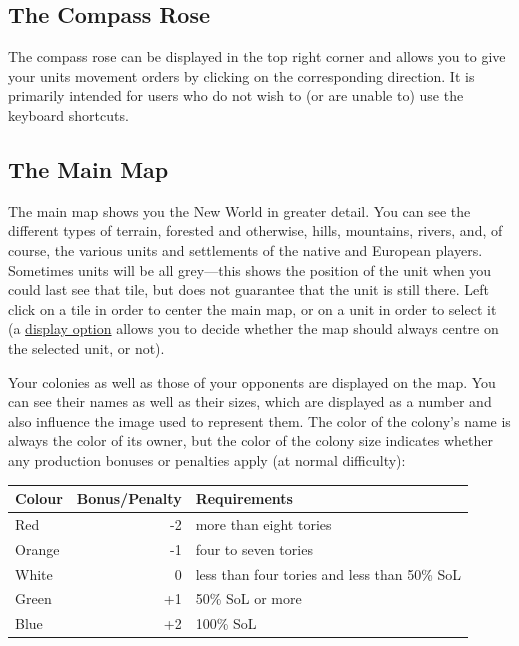 \documentclass[12pt]{book}
\begin{document}
\hypertarget{compass rose}{\subsection{The Compass Rose}}

The compass rose can be displayed in the top right corner and allows
you to give your units movement orders by clicking on the corresponding
direction. It is primarily intended for users who do not wish to (or
are unable to) use the keyboard shortcuts.


\hypertarget{main map}{\subsection{The Main Map}}

The main map shows you the New World in greater detail. You can see
the different types of terrain, forested and otherwise, hills,
mountains, rivers, and, of course, the various units and settlements
of the native and European players. Sometimes units will be all
grey---this shows the position of the unit when you could last see
that tile, but does not guarantee that the unit is still there. Left
click on a tile in order to center the main map, or on a unit in order
to select it (a \hyperlink{display options}{display option} allows you
to decide whether the map should always centre on the selected unit,
or not).

Your colonies as well as those of your opponents are displayed on the
map. You can see their names as well as their sizes, which are
displayed as a number and also influence the image used to represent
them. The color of the colony's name is always the color of its owner,
but the color of the colony size indicates whether any production
bonuses or penalties apply (at normal difficulty):

\vskip5mm

\begin{tabular}{l r l}
Colour&Bonus/Penalty&Requirements\\
\hline
Red    & -2 & more than eight tories\\
Orange & -1 & four to seven tories\\
White  &  0 & less than four tories and less than 50\% SoL\\
Green  & +1 & 50\% SoL or more\\
Blue   & +2 & 100\% SoL\\
\end{tabular}

\vskip5mm
\end{document}
